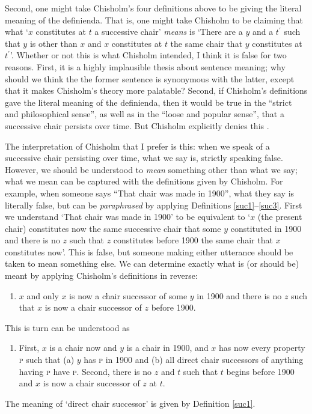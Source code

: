 \documentclass[12pt,twoside]{reedfancy}
\begin{document}
\begin{spacing}{1.25}
Second, one might take Chisholm's four definitions above to be giving
the literal meaning of the definienda.  That is, one might take
Chisholm to be claiming that what `$x$ constitutes at $t$ a successive
chair' {\em means} is `There are a $y$ and a $t^{\prime}$ such that
$y$ is other than $x$ and $x$ constitutes at $t$ the same chair that
$y$ constitutes at $t^{\prime}$'.  Whether or not this is what
Chisholm intended, I think it is false for two reasons.  First, it is
a highly implausible thesis about sentence meaning; why should we
think the the former sentence is synonymous with the latter, except
that it makes Chisholm's theory more palatable?  Second, if Chisholm's
definitions gave the literal meaning of the definienda, then it would
be true in the ``strict and philosophical sense'', as well as in the
``loose and popular sense'', that a successive chair persists over
time.  But Chisholm explicitly denies this
\citeyearpar[96--97]{chisholm1979}.

The interpretation of Chisholm that I prefer is this: when we speak of
a successive chair persisting over time, what we say is, strictly
speaking false.  However, we should be understood to {\em mean}
something other than what we say; what we mean can be captured with
the definitions given by Chisholm.  For example, when someone says
``That chair was made in 1900'', what they say is literally false, but
can be {\em paraphrased} by applying Definitions
\ref{suc1}--\ref{suc3}.  First we understand `That chair was made in
1900' to be equivalent to `$x$ (the present chair) constitutes now the
same successive chair that some $y$ constituted in 1900 and there is
no $z$ such that $z$ constitutes before 1900 the same chair that $x$
constitutes now'.  This is false, but someone making either utterance
should be taken to mean something else.  We can determine exactly what
is (or should be) meant by applying Chisholm's definitions in reverse:

\begin{enumerate}[start=3]
  \item $x$ and only $x$ is now a chair successor of some $y$ in 1900
    and there is no $z$ such that $x$ is now a chair successor of $z$
    before 1900.
\end{enumerate}
This is turn can be understood as

\begin{enumerate}[start=2]
  \item First, $x$ is a chair now and $y$ is a chair in 1900, and $x$
    has now every property \textsc{p} such that (a) $y$ has \textsc{p}
    in 1900 and (b) all direct chair successors of anything having
    \textsc{p} have \textsc{p}.  Second, there is no $z$ and $t$ such
    that $t$ begins before 1900 and $x$ is now a chair successor of
    $z$ at $t$.
\end{enumerate}
The meaning of `direct chair successor' is given by Definition
\ref{suc1}.


\end{spacing}
\end{document}
